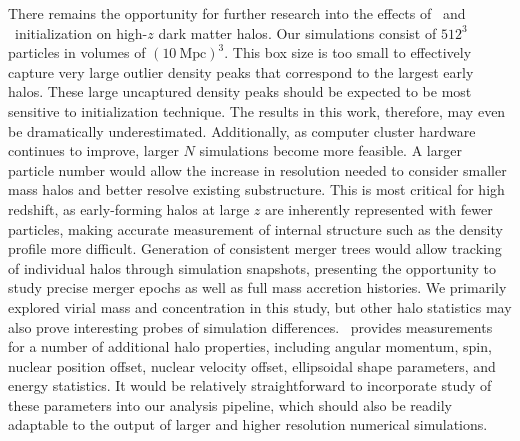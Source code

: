 There remains the opportunity for further research into the effects of \za\ and \lpt\ initialization on high-$z$ dark matter halos.  Our simulations consist of $512^{3}$ particles in volumes of $(10~\mathrm{Mpc})^{3}$.  This box size is too small to effectively capture very large outlier density peaks that correspond to the largest early halos.  These large uncaptured density peaks should be expected to be most sensitive to initialization technique.  The results in this work, therefore, may even be dramatically underestimated.  Additionally, as computer cluster hardware continues to improve, larger $N$ simulations become more feasible.  A larger particle number would allow the increase in resolution needed to consider smaller mass halos and better resolve existing substructure.  This is most critical for high redshift, as early-forming halos at large $z$ are inherently represented with fewer particles, making accurate measurement of internal structure such as the density profile more difficult.  Generation of consistent merger trees would allow tracking of individual halos through simulation snapshots, presenting the opportunity to study precise merger epochs as well as full mass accretion histories.  We primarily explored virial mass and concentration in this study, but other halo statistics may also prove interesting probes of simulation differences.  \rockstar\ provides measurements for a number of additional halo properties, including angular momentum, spin, nuclear position offset, nuclear velocity offset, ellipsoidal shape parameters, and energy statistics.  It would be relatively straightforward to incorporate study of these parameters into our analysis pipeline, which should also be readily adaptable to the output of larger and higher resolution numerical simulations.




